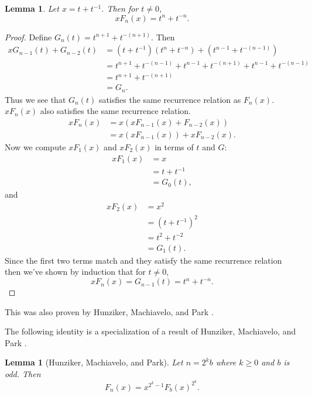 \documentclass[a4paper]{article}
\newtheorem{lemma}[theorem]{Lemma}
\begin{document}
	\begin{lemma}\label{FibonacciFormulaT}
		Let $x = t + t^{-1}$.
		Then for $t \neq 0$,
		\begin{equation*}
			xF_n(x) = t^{n} + t^{-n}.
		\end{equation*}
	\end{lemma}
	\begin{proof}
		Define $G_n(t) = t^{n+1} + t^{-(n+1)}$.
		Then
		\begin{align*}
			xG_{n-1}(t) + G_{n-2}(t) &= (t+t^{-1})(t^{n}+t^{-n}) + (t^{n-1}+t^{-(n-1)}) \\
			&= t^{n+1} + t^{-(n-1)} + t^{n-1} + t^{-(n+1)} + t^{n-1} + t^{-(n-1)} \\
			&= t^{n+1} + t^{-(n+1)} \\
			&= G_n.
		\end{align*}
		Thus we see that $G_n(t)$ satisfies the same recurrence relation as $F_n(x)$.
		$xF_n(x)$ also satisfies the same recurrence relation.
		\begin{align*}
			xF_n(x) &= x(xF_{n-1}(x)+F_{n-2}(x)) \\
			&= x(xF_{n-1}(x)) + xF_{n-2}(x).
		\end{align*}
		Now we compute $xF_1(x)$ and $xF_2(x)$ in terms of $t$ and $G$:
		\begin{align*}
			xF_1(x) &= x \\
			&= t + t^{-1} \\
			&= G_0(t),
		\end{align*}
		and
		\begin{align*}
			xF_2(x) &= x^2 \\
			&= (t+t^{-1})^2 \\
			&= t^2 + t^{-2} \\
			&= G_1(t).
		\end{align*}
		Since the first two terms match and they satisfy the same recurrence relation then we've shown by induction that for $t \neq 0$,
		\begin{equation*}
			xF_n(x) = G_{n-1}(t) = t^{n} + t^{-n}.
		\end{equation*}
	\end{proof}
	This was also proven by Hunziker, Machiavelo, and Park \cite[Proposition 2.3]{HUNZIKER2004465}.
	
	The following identity is a specialization of a result of Hunziker, Machiavelo, and Park \cite[Lemma 2.6]{HUNZIKER2004465}.
	\begin{lemma}[Hunziker, Machiavelo, and Park]\label{Fibonacci2k}
		Let $n = 2^k b$ where $k \geq 0$ and $b$ is odd.
		Then
		\begin{equation*}
			F_n(x) = x^{2^k-1}F_b(x)^{2^k}.
		\end{equation*}
	\end{lemma}
	
\end{document}
